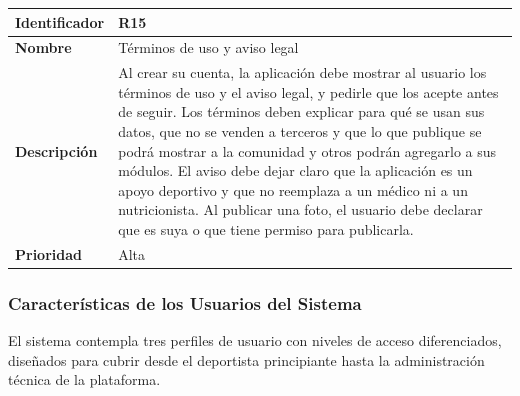 \begin{table}[h!]
    \centering
    \renewcommand{\arraystretch}{1.3}
    \begin{tabular}{|p{3.5cm}|p{11.5cm}|}
        \hline
        \rowcolor[HTML]{EFEFEF}
        \textbf{Identificador} & \textbf{R15} \\ \hline
        \textbf{Nombre} & Términos de uso y aviso legal \\ \hline
        \textbf{Descripción} & Al crear su cuenta, la aplicación debe mostrar al usuario los términos de uso y el aviso legal, y pedirle que los acepte antes de seguir. Los términos deben explicar para qué se usan sus datos, que no se venden a terceros y que lo que publique se podrá mostrar a la comunidad y otros podrán agregarlo a sus módulos. El aviso debe dejar claro que la aplicación es un apoyo deportivo y que no reemplaza a un médico ni a un nutricionista. Al publicar una foto, el usuario debe declarar que es suya o que tiene permiso para publicarla. \\ \hline
        \textbf{Prioridad} & Alta \\ \hline
    \end{tabular}
\end{table}
\newpage
\subsubsection{Características de los Usuarios del Sistema}
El sistema contempla tres perfiles de usuario con niveles de acceso diferenciados, diseñados para cubrir desde el deportista principiante hasta la administración técnica de la plataforma.

